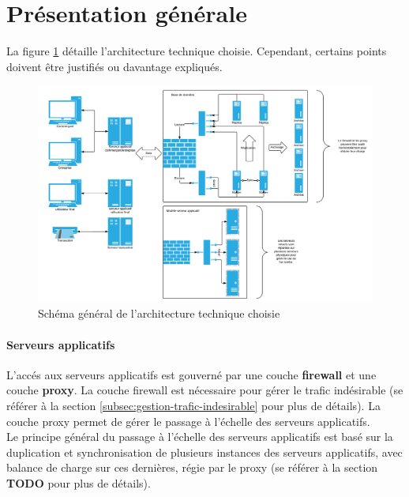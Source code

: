 




\section{Présentation générale}

La figure \ref{fig:network} détaille l'architecture technique choisie.
Cependant, certains points doivent être justifiés ou davantage expliqués.

\begin{figure}[htpb]
    \centering
    \includegraphics[width=\textwidth]{network}
    \caption{Schéma général de l'architecture technique choisie}
    \label{fig:network}
\end{figure}

\paragraph{Serveurs applicatifs}

L'accés aux serveurs applicatifs est gouverné par une couche \textbf{firewall}
et une couche \textbf{proxy}. La couche firewall est nécessaire pour gérer le
trafic indésirable (se référer à la section
\ref{subsec:gestion-trafic-indesirable} pour plus de détails). La couche proxy
permet de gérer le passage à l'échelle des serveurs applicatifs. \\

Le principe général du passage à l'échelle des serveurs applicatifs est basé
sur la duplication et synchronisation de plusieurs instances des serveurs
applicatifs, avec balance de charge sur ces dernières, régie par le proxy (se
référer à la section {\huge \textbf{TODO} } pour plus de détails).

